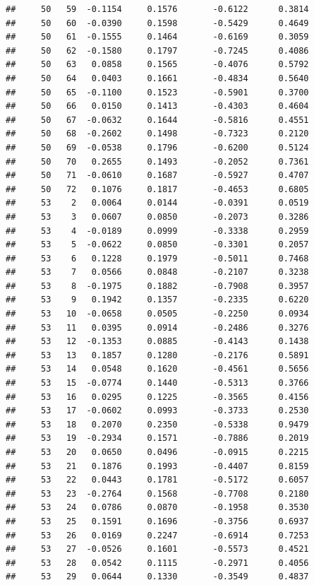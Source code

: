 \documentclass[
]{article}
\begin{document}
\begin{verbatim}
##     50   59  -0.1154     0.1576       -0.6122      0.3814  
##     50   60  -0.0390     0.1598       -0.5429      0.4649  
##     50   61  -0.1555     0.1464       -0.6169      0.3059  
##     50   62  -0.1580     0.1797       -0.7245      0.4086  
##     50   63   0.0858     0.1565       -0.4076      0.5792  
##     50   64   0.0403     0.1661       -0.4834      0.5640  
##     50   65  -0.1100     0.1523       -0.5901      0.3700  
##     50   66   0.0150     0.1413       -0.4303      0.4604  
##     50   67  -0.0632     0.1644       -0.5816      0.4551  
##     50   68  -0.2602     0.1498       -0.7323      0.2120  
##     50   69  -0.0538     0.1796       -0.6200      0.5124  
##     50   70   0.2655     0.1493       -0.2052      0.7361  
##     50   71  -0.0610     0.1687       -0.5927      0.4707  
##     50   72   0.1076     0.1817       -0.4653      0.6805  
##     53    2   0.0064     0.0144       -0.0391      0.0519  
##     53    3   0.0607     0.0850       -0.2073      0.3286  
##     53    4  -0.0189     0.0999       -0.3338      0.2959  
##     53    5  -0.0622     0.0850       -0.3301      0.2057  
##     53    6   0.1228     0.1979       -0.5011      0.7468  
##     53    7   0.0566     0.0848       -0.2107      0.3238  
##     53    8  -0.1975     0.1882       -0.7908      0.3957  
##     53    9   0.1942     0.1357       -0.2335      0.6220  
##     53   10  -0.0658     0.0505       -0.2250      0.0934  
##     53   11   0.0395     0.0914       -0.2486      0.3276  
##     53   12  -0.1353     0.0885       -0.4143      0.1438  
##     53   13   0.1857     0.1280       -0.2176      0.5891  
##     53   14   0.0548     0.1620       -0.4561      0.5656  
##     53   15  -0.0774     0.1440       -0.5313      0.3766  
##     53   16   0.0295     0.1225       -0.3565      0.4156  
##     53   17  -0.0602     0.0993       -0.3733      0.2530  
##     53   18   0.2070     0.2350       -0.5338      0.9479  
##     53   19  -0.2934     0.1571       -0.7886      0.2019  
##     53   20   0.0650     0.0496       -0.0915      0.2215  
##     53   21   0.1876     0.1993       -0.4407      0.8159  
##     53   22   0.0443     0.1781       -0.5172      0.6057  
##     53   23  -0.2764     0.1568       -0.7708      0.2180  
##     53   24   0.0786     0.0870       -0.1958      0.3530  
##     53   25   0.1591     0.1696       -0.3756      0.6937  
##     53   26   0.0169     0.2247       -0.6914      0.7253  
##     53   27  -0.0526     0.1601       -0.5573      0.4521  
##     53   28   0.0542     0.1115       -0.2971      0.4056  
##     53   29   0.0644     0.1330       -0.3549      0.4837  

\end{verbatim}
\end{document}
